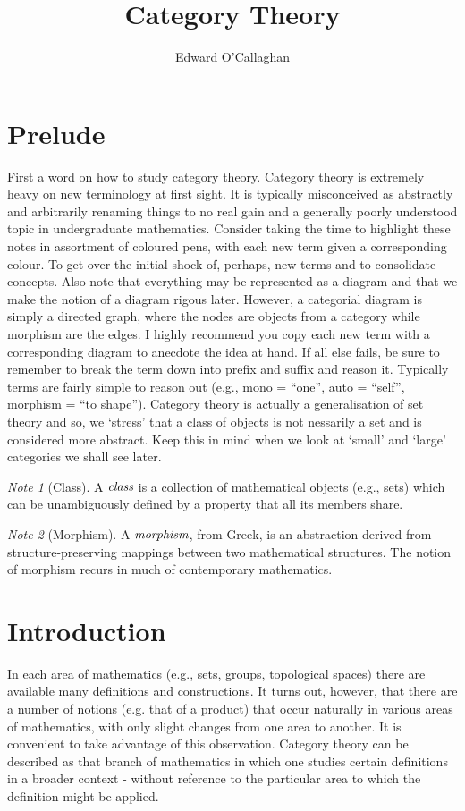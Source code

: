 \documentclass[10pt, oneside, reqno]{amsart}
\title{Category Theory}                               %
\author{Edward O'Callaghan}
\theoremstyle{plain}%
\theoremstyle{definition}
\theoremstyle{remark}
\newtheorem*{note}{Note}
\begin{document}
\maketitle \tableofcontents \clearpage

\section{Prelude} %
\label{sec:purelude}
First a word on how to study category theory. Category theory is extremely heavy on new terminology at first sight.
It is typically misconceived as abstractly and arbitrarily renaming things to no real gain and a generally poorly understood
topic in undergraduate mathematics. Consider taking the time to highlight these notes in assortment of coloured pens,
with each new term given a corresponding colour. To get over the initial shock of, perhaps, new terms and to consolidate concepts.
Also note that everything may be represented as a diagram and that we make the notion of a diagram rigous later. However,
a categorial diagram is simply a directed graph, where the nodes are objects from a category while morphism are the edges.
I highly recommend you copy each new term with a corresponding diagram to anecdote the idea at hand.
If all else fails, be sure to remember to break the term down into prefix and suffix and reason it.
Typically terms are fairly simple to reason out (e.g., mono = ``one'', auto = ``self'', morphism = ``to shape'').
Category theory is actually a generalisation of set theory and so, we `stress' that a class of objects is not
nessarily a set and is considered more abstract. Keep this in mind when we look at `small' and `large' categories
we shall see later.

\begin{note}[Class]
 A $\emph{class}$ is a collection of mathematical objects (e.g., sets)
 which can be unambiguously defined by a property that all its members share.
\end{note}

\begin{note}[Morphism]
 A $\emph{morphism}$, from Greek, is an abstraction derived from
 structure-preserving mappings between two mathematical structures.
 The notion of morphism recurs in much of contemporary mathematics.
\end{note}

\section{Introduction} %
\label{sec:introduction}
In each area of mathematics (e.g., sets, groups, topological spaces) there are available many definitions
and constructions. It turns out, however, that there are a number of notions (e.g. that of a product)
that occur naturally in various areas of mathematics, with only slight changes from one area to another.
It is convenient to take advantage of this observation. Category theory can be described as that branch of mathematics
in which one studies certain definitions in a broader context - without reference to the particular area to which
the definition might be applied.
\end{document}
